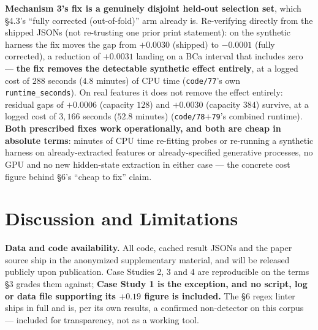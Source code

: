 \documentclass[10pt]{article} %
\begin{document}
\textbf{Mechanism 3's fix is a genuinely disjoint held-out selection set},
which \S4.3's ``fully corrected (out-of-fold)'' arm already is. Re-verifying
directly from the shipped JSONs (not re-trusting one prior print statement):
on the synthetic harness the fix moves the gap from $+0.0030$ (shipped) to
$-0.0001$ (fully corrected), a reduction of $+0.0031$ landing on a BCa
interval that includes zero --- \textbf{the fix removes the detectable
synthetic effect entirely}, at a logged cost of $288$ seconds ($4.8$ minutes)
of CPU time (\texttt{code/77}'s own \texttt{runtime\_seconds}). On real
features it does not remove the effect entirely: residual gaps of $+0.0006$
(capacity $128$) and $+0.0030$ (capacity $384$) survive, at a logged cost of
$3{,}166$ seconds ($52.8$ minutes) (\texttt{code/78}$+$\texttt{79}'s combined
runtime). \textbf{Both prescribed fixes work operationally, and both are cheap
in absolute terms}: minutes of CPU time re-fitting probes or re-running a
synthetic harness on already-extracted features or already-specified
generative processes, no GPU and no new hidden-state extraction in either
case --- the concrete cost figure behind \S6's ``cheap to fix'' claim.

\section{Discussion and Limitations}

\textbf{Data and code availability.} All code, cached result JSONs and the
paper source ship in the anonymized supplementary material, and will be
released publicly upon publication. Case Studies 2, 3 and 4 are reproducible on
the terms §3 grades them against; \textbf{Case Study 1 is the exception, and no
script, log or data file supporting its $+0.19$ figure is included.} The §6
regex linter ships in full and is, per its own results, a confirmed
non-detector on this corpus --- included for transparency, not as a working
tool.
\end{document}
